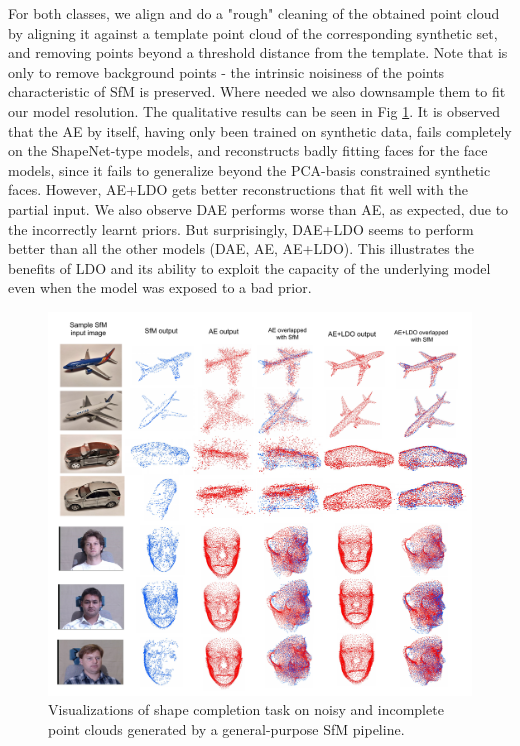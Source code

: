 \documentclass[10pt,twocolumn,letterpaper]{article}
\begin{document}
For both classes, we align and do a "rough" cleaning of the obtained point cloud by aligning it against a template point cloud of the corresponding synthetic set, and removing points beyond a threshold distance from the template. Note that is only to remove background points - the intrinsic noisiness of the points characteristic of SfM is preserved.  Where needed we also downsample them to fit our model resolution. The qualitative results can be seen in Fig \ref{fig:sfm_ldo}. It is observed that the AE by itself, having only been trained on synthetic data, fails completely on the ShapeNet-type models, and reconstructs badly fitting faces for the face models, since it fails to generalize beyond the PCA-basis constrained synthetic faces. However, AE+LDO gets better reconstructions that fit well with the partial input. We also observe DAE performs worse than AE, as expected, due to the incorrectly learnt priors. But surprisingly, DAE+LDO seems to perform better than all the other models (DAE, AE, AE+LDO). This illustrates the benefits of LDO and its ability to exploit the capacity of the underlying model even when the model was exposed to a bad prior.
\begin{figure}
\begin{center}
\includegraphics[width=1\linewidth]{sfm_ldo_wacv_ae.pdf}
\end{center}
   \caption{Visualizations of shape completion task on noisy and incomplete point clouds generated by a general-purpose SfM pipeline.}
   \vspace{-15pt}
\label{fig:sfm_ldo}
\end{figure}
\end{document}
